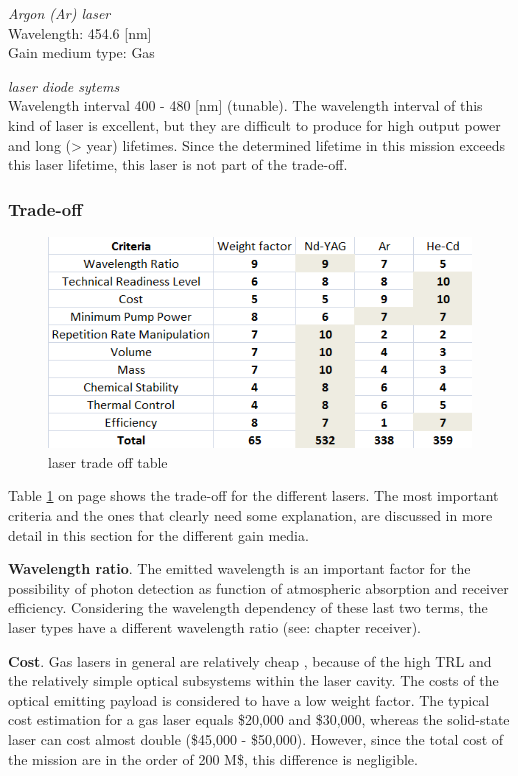 \textit{Argon (Ar) \acs{laser}}\\	
Wavelength: 454.6 [nm]\\
Gain medium type: Gas

\textit{\acs{laser} diode sytems}\\
Wavelength interval 400 - 480 [nm] (tunable). The wavelength interval of this kind of \acs{laser} is excellent, but they are difficult to produce for high output power and long (> year) lifetimes. Since the determined lifetime in this mission exceeds this \acs{laser} lifetime, this \acs{laser} is not part of the trade-off.
	
	\subsubsection{Trade-off}
\begin{figure}[ht!]
\centering
\includegraphics[scale=1]{chapters/img/laser_tradeoff.png}
\caption{\acs{laser} trade off table}
\label{table:laser_tradeoff}
\end{figure}

Table \ref{table:laser_tradeoff} on page \pageref{table:laser_tradeoff} shows the trade-off for the different \acs{laser}s. The most important  criteria and the ones that clearly need some explanation, are discussed in more detail in this section for the different gain media. 
	
\textbf{Wavelength ratio}. The emitted wavelength is an important factor for the possibility of photon detection as function of atmospheric absorption and receiver efficiency. Considering the wavelength dependency of these last two terms, the laser types have a different wavelength ratio (see: chapter receiver).

\textbf{Cost}. Gas \acs{laser}s in general are relatively cheap , because of the high \acs{TRL} and the relatively simple optical subsystems within the \acs{laser} cavity. The costs of the optical emitting payload is considered to have a low weight factor. The typical cost estimation for a gas \acs{laser} equals \$20,000 and \$30,000, whereas the solid-state \acs{laser} can cost almost double (\$45,000 - \$50,000). However, since the total cost of the mission are in the order of 200 M\$, this difference is negligible.
 
